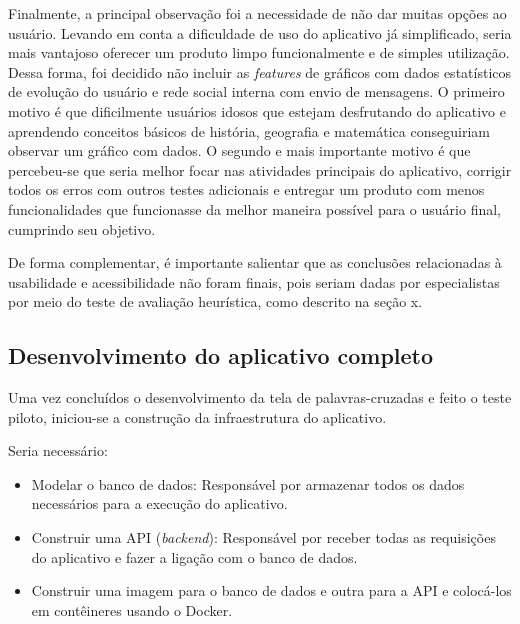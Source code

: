 Finalmente, a principal observação foi a necessidade de não dar muitas opções ao usuário. Levando em conta a dificuldade de uso do aplicativo já simplificado, seria mais vantajoso oferecer um produto limpo funcionalmente e de simples utilização. Dessa forma, foi decidido não incluir as \textit{features} de gráficos com 
dados estatísticos de evolução do usuário e rede social interna
com envio de mensagens. O primeiro motivo é que dificilmente
usuários idosos que estejam desfrutando do aplicativo e 
aprendendo conceitos básicos de história, geografia e
matemática conseguiriam observar um gráfico com dados.
O segundo e mais importante motivo é que percebeu-se que seria melhor focar
nas atividades principais do aplicativo, corrigir todos os erros com outros testes adicionais
e entregar um produto com menos funcionalidades que
funcionasse da melhor maneira possível para o usuário final, cumprindo seu objetivo.

De forma complementar, é importante salientar que as conclusões relacionadas à usabilidade e acessibilidade não foram finais, pois seriam dadas por especialistas por meio do teste de avaliação heurística, como descrito na seção x.

\subsection{Desenvolvimento do aplicativo completo}
Uma vez concluídos o desenvolvimento da tela de palavras-cruzadas e feito o teste piloto, iniciou-se a construção da infraestrutura do aplicativo.

Seria necessário:
\begin{itemize}
    \item Modelar o banco de dados: Responsável por armazenar todos os dados necessários para a execução do aplicativo.

    \item Construir uma API (\textit{backend}): Responsável por receber todas as requisições do aplicativo e fazer a ligação com o banco de dados.
    
    \item Construir uma imagem para o banco de dados e outra para a API e colocá-los em contêineres usando o Docker.
\end{itemize}


